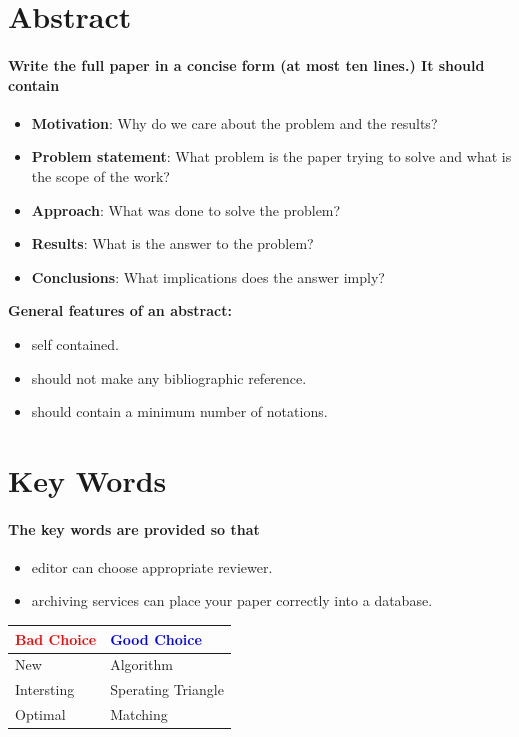 \documentclass[20pt]{report}
\begin{document}
\section{Abstract}
\paragraph{ Write the full paper in a concise form (at most ten lines.)
It should contain}
\begin{itemize}
\item \textbf {Motivation}: Why do we care about the problem and the
results?
\item \textbf {Problem statement}: What problem is the paper trying to
solve and what is the scope of the work?
\item \textbf {Approach}: What was done to solve the problem?
\item \textbf {Results}: What is the answer to the problem?
\item \textbf {Conclusions}: What implications does the answer imply?
\end{itemize}
\textbf{General features of an abstract:}
\begin{itemize}
\item self contained.
\item should not make any bibliographic reference.
\item should contain a minimum number of notations.
\end{itemize}

\section{Key Words}
\paragraph{The key words are provided so that}
\begin{itemize}
\item editor can choose appropriate reviewer.
\item archiving services can place your paper correctly into a
database.
\end{itemize}
  \begin{center}
\begin{tabular}[t]{|p{}|p{}|}
\hline
\textcolor {red} {Bad Choice} & \textcolor {blue} {Good Choice} \\
\hline
New & Algorithm\\
\hline
Intersting & Sperating Triangle\\
\hline
\hline
Optimal & Matching\\
\hline
\end{tabular}
\end{center}
\end{document}
